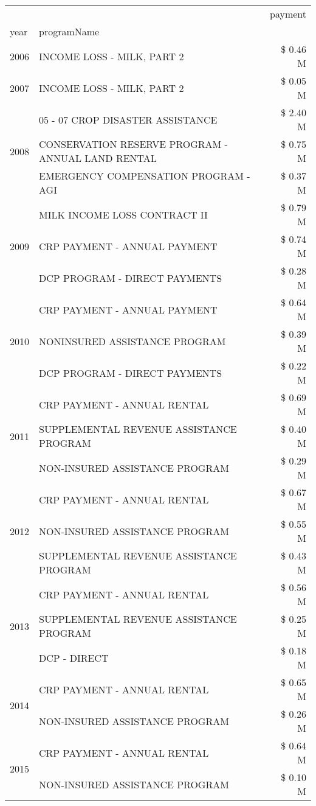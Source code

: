 \begin{tabular}{llr}
\toprule
 &  & payment \\
year & programName &  \\
\midrule
2006 & INCOME LOSS - MILK, PART 2 & \$ 0.46 M \\
\cline{1-3}
2007 & INCOME LOSS - MILK, PART 2 & \$ 0.05 M \\
\cline{1-3}
\multirow[t]{3}{*}{2008} & 05 - 07 CROP DISASTER ASSISTANCE & \$ 2.40 M \\
 & CONSERVATION RESERVE PROGRAM - ANNUAL LAND RENTAL & \$ 0.75 M \\
 & EMERGENCY COMPENSATION PROGRAM - AGI & \$ 0.37 M \\
\cline{1-3}
\multirow[t]{3}{*}{2009} & MILK INCOME LOSS CONTRACT II & \$ 0.79 M \\
 & CRP PAYMENT - ANNUAL PAYMENT & \$ 0.74 M \\
 & DCP PROGRAM - DIRECT PAYMENTS & \$ 0.28 M \\
\cline{1-3}
\multirow[t]{3}{*}{2010} & CRP PAYMENT - ANNUAL PAYMENT & \$ 0.64 M \\
 & NONINSURED ASSISTANCE PROGRAM & \$ 0.39 M \\
 & DCP PROGRAM - DIRECT PAYMENTS & \$ 0.22 M \\
\cline{1-3}
\multirow[t]{3}{*}{2011} & CRP PAYMENT - ANNUAL RENTAL & \$ 0.69 M \\
 & SUPPLEMENTAL REVENUE ASSISTANCE PROGRAM & \$ 0.40 M \\
 & NON-INSURED ASSISTANCE PROGRAM & \$ 0.29 M \\
\cline{1-3}
\multirow[t]{3}{*}{2012} & CRP PAYMENT - ANNUAL RENTAL & \$ 0.67 M \\
 & NON-INSURED ASSISTANCE PROGRAM & \$ 0.55 M \\
 & SUPPLEMENTAL REVENUE ASSISTANCE PROGRAM & \$ 0.43 M \\
\cline{1-3}
\multirow[t]{3}{*}{2013} & CRP PAYMENT - ANNUAL RENTAL & \$ 0.56 M \\
 & SUPPLEMENTAL REVENUE ASSISTANCE PROGRAM & \$ 0.25 M \\
 & DCP - DIRECT & \$ 0.18 M \\
\cline{1-3}
\multirow[t]{2}{*}{2014} & CRP PAYMENT - ANNUAL RENTAL & \$ 0.65 M \\
 & NON-INSURED ASSISTANCE PROGRAM & \$ 0.26 M \\
\cline{1-3}
\multirow[t]{3}{*}{2015} & CRP PAYMENT - ANNUAL RENTAL & \$ 0.64 M \\
 & NON-INSURED ASSISTANCE PROGRAM & \$ 0.10 M \\

\end{tabular}
